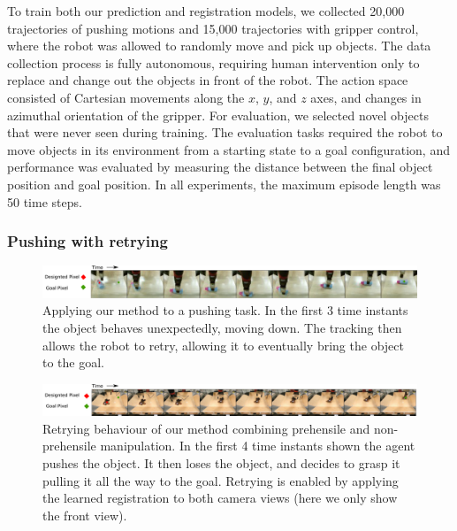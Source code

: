 To train both our prediction and registration models, we collected 20,000 trajectories of pushing motions and 15,000 trajectories with gripper control, where the robot was allowed to randomly move and pick up objects. The data collection process is fully autonomous, requiring human intervention only to replace and change out the objects in front of the robot.
The action space consisted of Cartesian movements along the $x$, $y$, and $z$ axes, and changes in azimuthal orientation of the gripper. For evaluation, we selected novel objects that were never seen during training. The evaluation tasks required the robot to move objects in its environment from a starting state to a goal configuration, and performance was evaluated by measuring the distance between the final object position and goal position. In all experiments, the maximum episode length was 50 time steps.



\subsubsection{Pushing with retrying}
\begin{figure}
    \centering
    \includegraphics[width=1.0\textwidth]{images_rfr/push_correction.pdf}
    \caption{\small{Applying our method to a pushing task. In the first 3 time instants the object behaves unexpectedly, moving down. The tracking then allows the robot to retry, allowing it to eventually bring the object to the goal.}}
    \label{fig:push_retry}
\end{figure}

\begin{figure}
    \centering
    \includegraphics[width=1.0\textwidth]{images_rfr/pick_place_plush.pdf}
    \caption{\small{Retrying behaviour of our method combining prehensile and non-prehensile manipulation. In the first 4 time instants shown the agent pushes the object. It then loses the object, and decides to grasp it pulling it all the way to the goal. Retrying is enabled by applying the learned registration to both camera views (here we only show the front view).}}
    \label{fig:discrete}
\end{figure}

